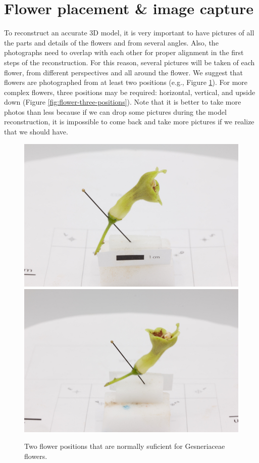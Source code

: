 \documentclass[
]{book}
\begin{document}
\hypertarget{flower-placement-image-capture}{%
\section{Flower placement \& image capture}\label{flower-placement-image-capture}}

To reconstruct an accurate 3D model, it is very important to have
pictures of all the parts and details of the flowers and from several
angles. Also, the photographs need to overlap with each other for proper
alignment in the first steps of the reconstruction. For this reason,
several pictures will be taken of each flower, from different
perspectives and all around the flower. We suggest that flowers are
photographed from at least two positions (e.g., Figure \ref{fig:flower-two-positions}). For more complex flowers, three positions may be required: horizontal, vertical, and upside down (Figure
\ref{fig:flower-three-positions}). Note that it is better to take
more photos than less because if we can drop some pictures during the
model reconstruction, it is impossible to come back and take more
pictures if we realize that we should have.

\begin{figure}

{\centering \includegraphics[width=0.33\linewidth]{Figures/position_2} \includegraphics[width=0.33\linewidth]{Figures/position_5} 

}

\caption{Two flower positions that are normally suficient for Gesneriaceae flowers.}\label{fig:flower-two-positions}
\end{figure}
\end{document}
